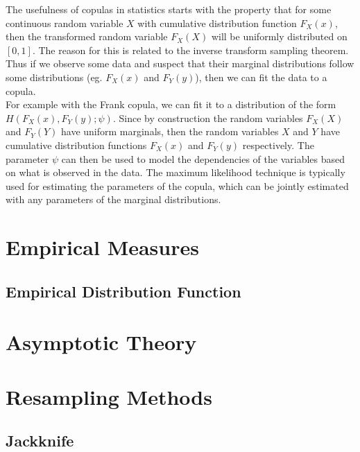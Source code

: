 \documentclass[11pt]{report} %
\begin{document}
The usefulness of copulas in statistics starts with the property that for some continuous random variable $X$ with cumulative distribution function $F_{X}\left(x\right)$, then the transformed random variable $F_{X}\left(X\right)$ will be uniformly distributed on $\left[0, 1\right]$. The reason for this is related to the inverse transform sampling theorem. Thus if we observe some data and suspect that their marginal distributions follow some distributions (eg. $F_{X}\left(x\right)$ and $F_{Y}\left(y\right)$), then we can fit the data to a copula. \\

For example with the Frank copula, we can fit it to a distribution of the form $H\left(F_{X}\left(x\right), F_{Y}\left(y\right); \psi\right)$. Since by construction the random variables $F_{X}\left(X\right)$ and $F_{Y}\left(Y\right)$ have uniform marginals, then the random variables $X$ and $Y$ have cumulative distribution functions $F_{X}\left(x\right)$ and $F_{Y}\left(y\right)$ respectively. The parameter $\psi$ can then be used to model the dependencies of the variables based on what is observed in the data. The maximum likelihood technique is typically used for estimating the parameters of the copula, which can be jointly estimated with any parameters of the marginal distributions.

\section{Empirical Measures}

\subsection{Empirical Distribution Function}

\section{Asymptotic Theory}

\section{Resampling Methods}

\subsection{Jackknife}
\end{document}
